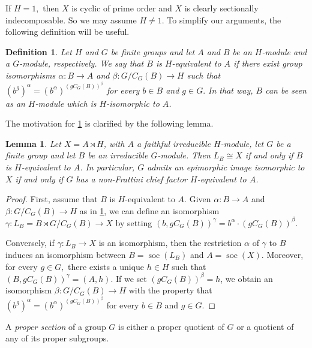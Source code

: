 \documentclass[10pt,a4paper]{amsart}
\newtheorem{lemma}[thm]{Lemma}
\newtheorem{definition}[thm]{Definition}
\DeclareMathOperator{\soc}{soc}
\begin{document}
If $H=1,$ then $X$ is cyclic of prime order and $X$ is clearly sectionally indecomposable. So we may assume $H\neq 1.$ 
To simplify our arguments, the following definition will be useful.


\begin{definition}\label{defequiv} Let $H$ and $G$ be finite groups and let $A$ and $B$ be an $H$-module and a $G$-module, respectively. We say that $B$ is \emph{$H$-equivalent} to $A$ if there exist group isomorphisms $\alpha: B\to A$ and $\beta: G/C_G(B)\to H$ such that $(b^g)^\alpha=(b^\alpha)^{(gC_G(B))^\beta}$ for every $b\in B$
and $g\in G.$  In that way, $B$ can be seen as an $H$-module which is $H$-isomorphic to $A$.
\end{definition}


The motivation for \cref{defequiv} is clarified by the following lemma.


\begin{lemma}\label{eqandcf}Let $X=A \rtimes H$, with $A$ a faithful irreducible $H$-module, let $G$ be a finite group and let $B$ be an irreducible $G$-module.  Then $L_B\cong X$ if and only if $B$ is $H$-equivalent to $A$. In particular, $G$ admits an epimorphic image isomorphic to $X$ if and only if $G$ has a non-Frattini chief factor $H$-equivalent to $A$.
\end{lemma}
\begin{proof}
    First, assume that $B$ is $H$-equivalent to $A$. Given $\alpha\colon B\to A$ and
    $\beta\colon G/C_G(B)\to H$ as in \cref{defequiv}, we can define an isomorphism
    $\gamma\colon L_B=B\rtimes G/C_G(B)\to X$ by setting $(b,gC_G(B))^\gamma=b^\alpha\cdot(gC_G(B))^\beta.$

    Conversely, if $\gamma\colon L_B\to X$ is an isomorphism, then the restriction $\alpha$ of $\gamma$ to $B$ induces an isomorphism between $B=\soc(L_B)$ and $A=\soc(X)$. Moreover, for every $g\in G,$ there exists a unique $h\in H$ such that $(B,gC_G(B))^\gamma=(A,h)$. If we set $(gC_G(B))^\beta=h$, we obtain an isomorphism $\beta\colon G/C_G(B)\to H$ with the property  that $(b^g)^\alpha=(b^\alpha)^{(gC_G(B))^\beta}$ for every $b\in B$
    and $g\in G.$
\end{proof}

A \emph{proper section} of a group $G$ is either a proper quotient of $G$ or a quotient of any of its proper subgroups.
\end{document}
